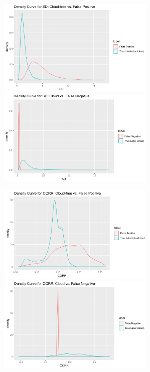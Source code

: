 \documentclass[11pt]{article}
\begin{document}
\includegraphics[width = 7.5cm]{4(b)SD1}
\includegraphics[width = 7.5cm]{4(b)SD2}

\includegraphics[width = 7.5cm]{4(b)CORR1}
\includegraphics[width = 7.5cm]{4(b)CORR2}
\end{document}
